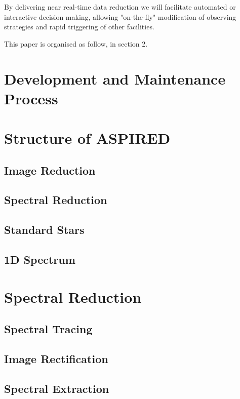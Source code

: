 \documentclass[fleqn,usenatbib]{mnras}
\begin{document}
By delivering near real-time data reduction we will facilitate automated or interactive
decision making, allowing "on-the-fly" modification of observing strategies and rapid
triggering of other facilities.

This paper is organised as follow, in section 2.

\section{Development and Maintenance Process}

\section{Structure of ASPIRED}

\subsection*{Image Reduction}

\subsection*{Spectral Reduction}

\subsection*{Standard Stars}

\subsection*{1D Spectrum}

\section{Spectral Reduction}

\subsection{Spectral Tracing}

\subsection{Image Rectification}

\subsection{Spectral Extraction}
\end{document}
